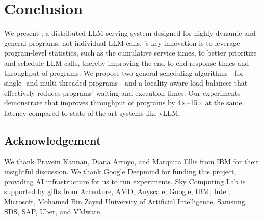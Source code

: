 \section{Conclusion}
\label{sec:conclusion}
We present \text{\name}, a distributed LLM serving system designed for highly-dynamic and general programs, not individual LLM calls. \text{\name}'s key innovation is to leverage program-level statistics, such as the cumulative service times, to better prioritize and schedule LLM calls, thereby improving the end-to-end response times and throughput of programs. We propose two general scheduling algorithms—for single- and multi-threaded programs—and a locality-aware load balancer that effectively reduces programs' waiting and execution times. Our experiments demonstrate that \text{\name} improves throughput of programs by 4×–15× at the same latency compared to state-of-the-art systems like vLLM.

\subsection*{Acknowledgement} We thank Pravein Kannan, Diana Arroyo, and Marquita Ellis from IBM for their insightful discussion. We thank Google Deepmind for funding this project, providing AI infrastructure for us to run experiments. Sky Computing Lab is supported by gifts from Accenture, AMD, Anyscale, Google, IBM, Intel, Microsoft, Mohamed Bin Zayed University of Artificial Intelligence, Samsung SDS, SAP, Uber, and VMware. 